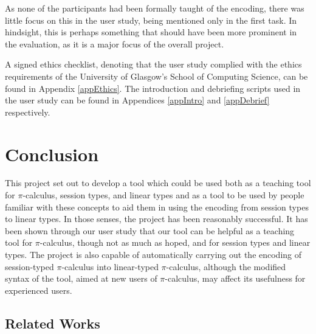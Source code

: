 \documentclass{l4proj}
\begin{document}
\quad As none of the participants had been formally taught of the encoding, there was little focus on this in the user study, being mentioned only in the first task. In hindsight, this is perhaps something that should have been more prominent in the evaluation, as it is a major focus of the overall project.

\quad A signed ethics checklist, denoting that the user study complied with the ethics requirements of the University of Glasgow's School of Computing Science, can be found in Appendix \ref{appEthics}. The introduction and debriefing scripts used in the user study can be found in Appendices \ref{appIntro} and \ref{appDebrief} respectively.


\chapter{Conclusion}
\label{conclusion}

\quad This project set out to develop a tool which could be used both as a teaching tool for $\pi$-calculus, session types, and linear types and as a tool to be used by people familiar with these concepts to aid them in using the encoding from session types to linear types. In those senses, the project has been reasonably successful. It has been shown through our user study that our tool can be helpful as a teaching tool for $\pi$-calculus, though not as much as hoped, and for session types and linear types. The project is also capable of automatically carrying out the encoding of session-typed $\pi$-calculus into linear-typed $\pi$-calculus, although the modified syntax of the tool, aimed at new users of $\pi$-calculus, may affect its usefulness for experienced users.

\section{Related Works}
\label{concRelated}
\end{document}
